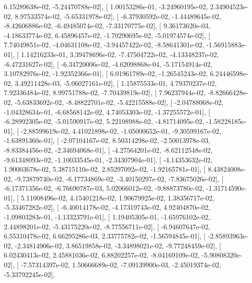 \documentclass{article}
\begin{document}
          6.15289638e-02,  -5.24470788e-02],
       [  1.00153286e-01,  -3.24960195e-02,   2.34904523e-02,
          8.97533574e-02,  -5.65331978e-02],
       [ -6.37930592e-02,  -1.44489645e-02,  -8.42606886e-02,
         -6.49485074e-02,  -7.33170775e-02],
       [  9.36173620e-03,  -4.18633774e-02,   6.45896457e-02,
         -1.70290695e-02,  -5.01974574e-02],
       [  7.74049851e-02,  -4.04631108e-02,  -3.94457422e-02,
         -8.58641301e-02,  -1.56915883e-01],
       [  1.14216233e-01,   3.39478696e-02,  -7.47504722e-02,
         -4.13348237e-02,  -6.47231627e-02],
       [ -6.34720006e-02,  -4.62098868e-04,  -5.17154914e-02,
          3.10782976e-02,  -1.92352366e-01],
       [  6.01961789e-02,  -1.26545243e-02,   6.24446598e-02,
          3.49211428e-03,  -5.06027161e-02],
       [  1.15875533e-01,   4.79370237e-02,   7.92336484e-02,
          8.99751788e-02,  -7.70439819e-02],
       [  7.96237944e-02,  -8.82666428e-02,  -5.63833692e-02,
         -8.48822701e-02,  -5.42215588e-02],
       [ -2.04788068e-02,  -1.04328634e-01,  -6.68568142e-02,
          4.74053303e-02,  -1.37255572e-01],
       [ -6.28992305e-02,  -5.01590917e-02,   5.22108988e-02,
         -4.81714095e-02,  -1.58228185e-01],
       [ -2.88599619e-02,   4.41021898e-02,  -1.05000652e-01,
         -9.30599167e-02,  -1.63891360e-01],
       [ -2.07104167e-02,   8.50314298e-02,  -2.50013978e-03,
         -8.83384456e-02,  -2.34694068e-01],
       [ -4.27564201e-02,  -8.62112548e-02,  -9.61348093e-02,
         -1.10033545e-01,  -2.34307904e-01],
       [ -4.14353632e-02,   1.90003678e-02,   5.38715110e-02,
          2.85297092e-02,  -1.92165781e-01],
       [  8.43824008e-02,  -9.73879740e-02,  -6.17734869e-02,
         -3.40150297e-02,  -7.83675026e-02],
       [ -6.17371356e-02,  -6.76690787e-03,   5.02066012e-02,
         -9.88873780e-02,  -1.31714590e-01],
       [  5.11008496e-02,   4.15401218e-02,   1.90679925e-02,
          1.38356717e-02,  -5.33467282e-02],
       [ -6.40014178e-02,  -4.17319743e-02,   4.92404870e-02,
         -1.09803283e-01,  -1.13323791e-01],
       [  1.19405305e-01,  -1.65976102e-02,   2.44898201e-02,
         -5.43175220e-02,  -8.77556711e-02],
       [ -6.94607647e-02,   6.55310478e-02,   6.66295286e-03,
          2.33775782e-02,  -1.56594845e-01],
       [ -2.85893963e-02,  -2.34814906e-02,   3.86519858e-02,
         -3.34898021e-02,  -9.77248459e-02],
       [  6.02430413e-02,   2.45881036e-02,   6.88202257e-02,
         -8.04169109e-02,  -5.90808320e-02],
       [ -7.57314397e-02,   1.50666689e-02,  -7.09139900e-03,
         -2.45019374e-02,  -5.33792245e-02],
\end{document}

